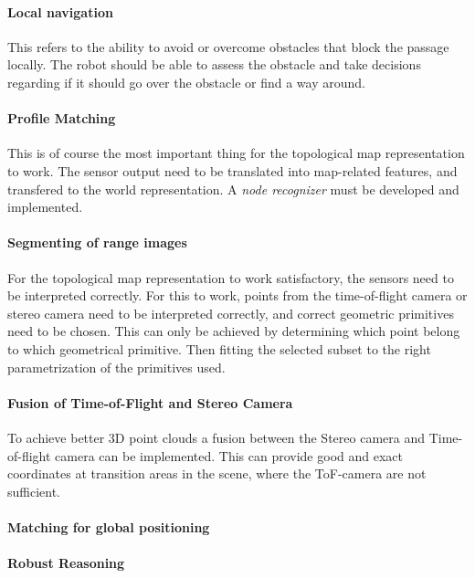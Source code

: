 \paragraph{Local navigation} This refers to the ability to avoid or overcome obstacles
that block the passage locally. The robot should be able to assess the obstacle and take
decisions regarding if it should go over the obstacle or find a way around. 

\paragraph{Profile Matching} This is of course the most important thing for the
topological map representation to work. The sensor output need to be translated into 
map-related features, and transfered to the world representation. A \emph{node recognizer}
must be developed and implemented.

\paragraph{Segmenting of range images} For the topological map representation to work
satisfactory, the sensors need to be interpreted correctly. For this to work, points from
the time-of-flight camera or stereo camera need to be interpreted correctly, and correct
geometric primitives need to be chosen.  This can only
be achieved by determining which point belong to which geometrical primitive. Then fitting
the selected subset to the right parametrization of the primitives used. 

\paragraph{Fusion of Time-of-Flight and Stereo Camera} To achieve better 3D point clouds
a fusion between the Stereo camera and Time-of-flight camera can be implemented. This can
provide good and exact coordinates at transition areas in the scene, where the ToF-camera
are not sufficient. 


\paragraph{Matching for global positioning}

\paragraph{Robust Reasoning}



